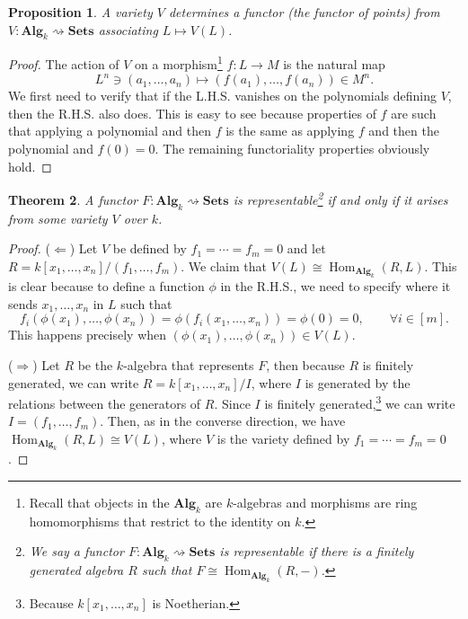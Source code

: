 \documentclass{tufte-handout} %
\newtheorem{thm}{Theorem}
\newtheorem{prop}[thm]{Proposition}
\theoremstyle{definition}
\theoremstyle{remark}
\DeclareMathOperator{\Hom}{Hom}
\begin{document}
\begin{prop}
	A variety $V$ determines a functor (the functor of points) from $V: \textbf{Alg}_k \rightsquigarrow \textbf{Sets}$ associating $L \mapsto V(L)$.
\end{prop}
\begin{proof}
	 The action of $V$ on a morphism\footnote{Recall that objects in the $\textbf{Alg}_k$ are $k$-algebras and morphisms are ring homomorphisms that restrict to the identity on $k$.} $f:L \rightarrow M$ is the natural map \[L^n \ni (a_1, \dots, a_n) \mapsto (f(a_1), \dots, f(a_n))\in M^n.\] We first need to verify that if the L.H.S. vanishes on the polynomials defining $V$, then the R.H.S. also does. This is easy to see because properties of $f$ are such that applying a polynomial and then $f$ is the same as applying $f$ and then the polynomial and $f(0) = 0$. The remaining functoriality properties obviously hold.
\end{proof}

\begin{thm}
	A functor $F: \textbf{Alg}_k \rightsquigarrow \textbf{Sets}$ is representable\footnote{We say a functor $F:\textbf{Alg}_k \rightsquigarrow \textbf{Sets}$ is representable if there is a finitely generated algebra $R$ such that $F \cong \Hom_{\textbf{Alg}_k}(R, -)$.} if and only if it arises from some variety $V$ over $k$.
\end{thm}
\begin{proof}
	($\Leftarrow$) Let $V$ be defined by $f_1 = \cdots = f_m = 0$ and let $R = k[x_1, \dots, x_n]/(f_1, \dots, f_m)$. We claim that $V(L) \cong \Hom_{\textbf{Alg}_k}(R, L)$. This is clear because to define a function $\phi$ in the R.H.S., we need to specify where it sends $x_1, \dots, x_n$ in $L$ such that\[f_i(\phi(x_1), \dots, \phi(x_n)) = \phi(f_i(x_1, \dots, x_n)) = \phi(0) = 0, \qquad \forall i \in [m].\] This happens precisely when $(\phi(x_1), \dots, \phi(x_n)) \in V(L)$.
	
	($\Rightarrow$)	Let $R$ be the $k$-algebra that represents $F$, then because $R$ is finitely generated, we can write $R = k[x_1, \dots, x_n]/I$, where $I$ is generated by the relations between the generators of $R$. Since $I$ is finitely generated,\footnote{Because $k[x_1, \dots, x_n]$ is Noetherian.} we can write $I =(f_1, \dots, f_m)$. Then, as in the converse direction, we have $\Hom_{\textbf{Alg}_k}(R, L) \cong V(L)$, where $V$ is the variety defined by $f_1 = \cdots = f_m = 0$.
\end{proof}
\end{document}
